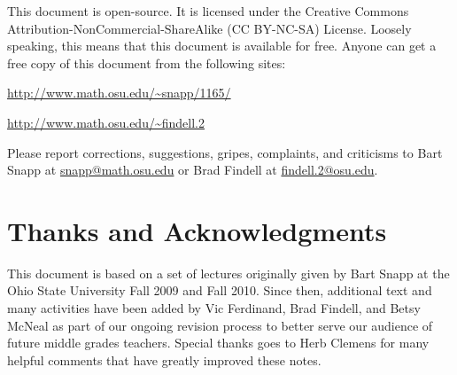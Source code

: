 This document is open-source. It is licensed under the Creative
Commons Attribution-NonCommercial-ShareAlike (CC BY-NC-SA)
License. Loosely speaking, this means that this document is available
for free. Anyone can get a free copy of this document 
from the following sites:
\begin{center}
\url{http://www.math.osu.edu/~snapp/1165/}

\url{http://www.math.osu.edu/~findell.2}
\end{center}

Please report corrections, suggestions, gripes, complaints, and
criticisms to Bart Snapp at \href{mailto:snapp@math.osu.edu}{snapp@math.osu.edu} or Brad Findell
at \href{mailto:findell.2@osu.edu}{findell.2@osu.edu}.  


\section*{Thanks and Acknowledgments}

This document is based on a set of lectures originally given by Bart
Snapp at the Ohio State University Fall 2009 and Fall 2010.  
Since then, additional text and many activities have been added by 
Vic Ferdinand, Brad Findell, and Betsy McNeal as part of our ongoing 
revision process to better serve our audience of future middle grades 
teachers. Special thanks goes to Herb Clemens for many helpful comments
that have greatly improved these notes.


\makeatletter %
\renewcommand{\l@section}{\@dottedtocline{1}{5em}{5em}}
\renewcommand{\l@subsection}{\@dottedtocline{2}{5em}{5em}}
\renewcommand{\l@subsubsection}{\@dottedtocline{3}{5em}{5em}}
\makeatother

\setcounter{tocdepth}{1}
\tableofcontents









